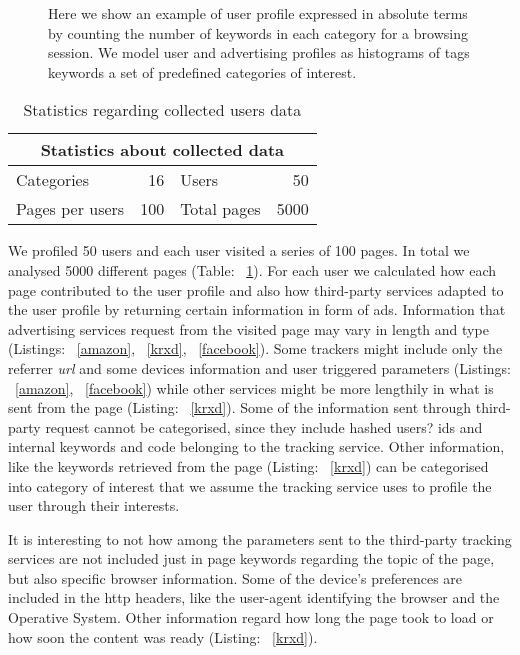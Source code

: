 \setcounter{figure}{3}
\begin{figure}
\centerline{\epsfxsize=350pt}
\caption{Here we show an example of user profile expressed in absolute terms by counting the number of keywords in each category for a browsing session. We model user and advertising profiles as histograms of tags keywords a set of predefined categories of interest.}
\label{abs-profile}
\end{figure}

\begin{table}[htbp]
\centering
\caption{\label{tableDatasetStats} Statistics regarding collected users data}
\def\arraystretch{2.5}
\begin{tabular}{| l | r | l | r | }
\hline
\multicolumn{4}{|c|}{Statistics about collected data}            \\[2.5mm] \hline
Categories               & 16    & Users                   & 50   \\[2.5mm] \hline
Pages per users    & 100 & Total pages      & 5000 \\[2.5mm] \hline
\end{tabular}
\end{table}

We profiled 50 users and each user visited a series of 100 pages. In total we analysed 5000 different pages (Table: ~\ref{tableDatasetStats}). For each user we calculated how each page contributed to the user profile and also how third-party services adapted to the user profile by returning certain information in form of ads. Information that advertising services request from the visited page may vary in length and type (Listings: ~\ref{amazon}, ~\ref{krxd}, ~\ref{facebook}). Some trackers might include only the referrer \emph{url} and some devices information and user triggered parameters (Listings: ~\ref{amazon}, ~\ref{facebook}) while other services might be more lengthily in what is sent from the page (Listing: ~\ref{krxd}). Some of the information sent through third-party request cannot be categorised, since they include hashed users? ids and internal keywords and code belonging to the tracking service. Other information, like the keywords retrieved from the page (Listing: ~\ref{krxd}) can be categorised into category of interest that we assume the tracking service uses to profile the user through their interests.

It is interesting to not how among the parameters sent to the third-party tracking services are not included just in page keywords regarding the topic of the page, but also specific browser information. Some of the device's preferences are included in the http headers, like the user-agent identifying the browser and the Operative System. Other information regard how long the page took to load or how soon the content was ready (Listing: ~\ref{krxd}).

